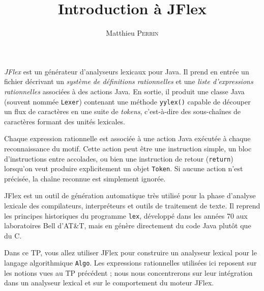 \documentclass[correction]{td}
\author{Matthieu \textsc{Perrin}}
\title{Introduction à JFlex}
\begin{document}
\maketitle

\emph{JFlex} est un générateur d'analyseurs lexicaux pour Java.
Il prend en entrée un fichier décrivant un \emph{système de définitions rationnelles}
et une \emph{liste d'expressions rationnelles} associées à des actions Java.
En sortie, il produit une classe Java (souvent nommée \texttt{Lexer})
contenant une méthode \texttt{yylex()} capable de découper un flux de caractères
en une suite de \emph{tokens}, c'est-à-dire des sous-chaînes de caractères formant des unités lexicales.

Chaque expression rationnelle est associée à une action Java exécutée à chaque reconnaissance du motif.
Cette action peut être une instruction simple, un bloc d'instructions entre accolades,
ou bien une instruction de retour (\texttt{return}) lorsqu'on veut produire explicitement un objet \texttt{Token}.
Si aucune action n'est précisée, la chaîne reconnue est simplement ignorée.

JFlex est un outil de génération automatique très utilisé pour la phase d'analyse lexicale des compilateurs,
interpréteurs et outils de traitement de texte. Il reprend les principes historiques du programme \texttt{lex},
développé dans les années 70 aux laboratoires Bell d'AT\&T, mais en génère directement du code Java plutôt que du C.

Dans ce TP, vous allez utiliser JFlex pour construire un analyseur lexical
pour le langage algorithmique \texttt{Algo}.
Les expressions rationnelles utilisées ici reposent sur les notions vues
au TP précédent ; nous nous concentrerons sur leur intégration
dans un analyseur lexical et sur le comportement du moteur JFlex.
\end{document}
